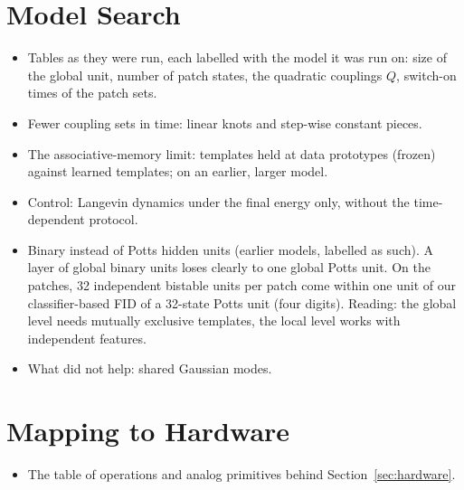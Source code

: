 \documentclass{article}
\newif\ifshownotes
\newenvironment{plan}
  {\begin{itemize}[leftmargin=1.1em,itemsep=1pt,topsep=2pt,parsep=0pt]\color{plancolor}}
  {\end{itemize}}
\newcommand{\todo}[1]{\ifshownotes\textcolor{tbdcolor}{[TODO: #1]}\fi}
\begin{document}
\section{Model Search}
\label{app:model-search}
\begin{plan}
  \item Tables as they were run, each labelled with the model it was run on:
        size of the global unit, number of patch states, the quadratic
        couplings $Q$, switch-on times of the patch sets.
  \item Fewer coupling sets in time: linear knots and step-wise constant
        pieces.
  \item The associative-memory limit: templates held at data prototypes
        (frozen) against learned templates; on an earlier, larger model.
  \item Control: Langevin dynamics under the final energy only, without the
        time-dependent protocol.
  \item Binary instead of Potts hidden units (earlier models, labelled as
        such). A layer of global binary units loses clearly to one global
        Potts unit. On the patches, 32 independent bistable units per patch
        come within one unit of our classifier-based FID of a 32-state Potts
        unit (four digits). Reading: the global level needs mutually exclusive
        templates, the local level works with independent features.
        \todo{optional: one run with binary patch units on the locked model,
        if this is to be a row for the current model.}
  \item What did not help: shared Gaussian modes.
\end{plan}

\section{Mapping to Hardware}
\label{app:hardware}
\begin{plan}
  \item The table of operations and analog primitives behind
        Section~\ref{sec:hardware}.
\end{plan}
\end{document}
